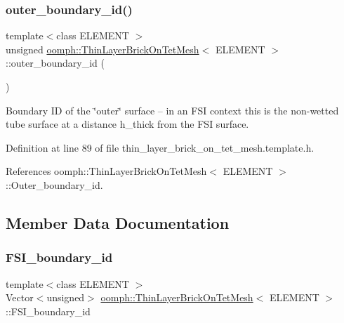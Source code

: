 \subsubsection{\texorpdfstring{outer\+\_\+boundary\+\_\+id()}{outer\_boundary\_id()}}
{\footnotesize\ttfamily template$<$class E\+L\+E\+M\+E\+NT $>$ \\
unsigned \hyperlink{classoomph_1_1ThinLayerBrickOnTetMesh}{oomph\+::\+Thin\+Layer\+Brick\+On\+Tet\+Mesh}$<$ E\+L\+E\+M\+E\+NT $>$\+::outer\+\_\+boundary\+\_\+id (\begin{DoxyParamCaption}{ }\end{DoxyParamCaption})\hspace{0.3cm}{\ttfamily [inline]}}



Boundary ID of the \char`\"{}outer\char`\"{} surface -- in an F\+SI context this is the non-\/wetted tube surface at a distance h\+\_\+thick from the F\+SI surface. 



Definition at line 89 of file thin\+\_\+layer\+\_\+brick\+\_\+on\+\_\+tet\+\_\+mesh.\+template.\+h.



References oomph\+::\+Thin\+Layer\+Brick\+On\+Tet\+Mesh$<$ E\+L\+E\+M\+E\+N\+T $>$\+::\+Outer\+\_\+boundary\+\_\+id.



\subsection{Member Data Documentation}
\mbox{\label{classoomph_1_1ThinLayerBrickOnTetMesh_ad2b0a664fa1fc0f6f530740e40591212}} 
\subsubsection{\texorpdfstring{F\+S\+I\+\_\+boundary\+\_\+id}{FSI\_boundary\_id}}
{\footnotesize\ttfamily template$<$class E\+L\+E\+M\+E\+NT $>$ \\
Vector$<$unsigned$>$ \hyperlink{classoomph_1_1ThinLayerBrickOnTetMesh}{oomph\+::\+Thin\+Layer\+Brick\+On\+Tet\+Mesh}$<$ E\+L\+E\+M\+E\+NT $>$\+::F\+S\+I\+\_\+boundary\+\_\+id\hspace{0.3cm}{\ttfamily [private]}}



